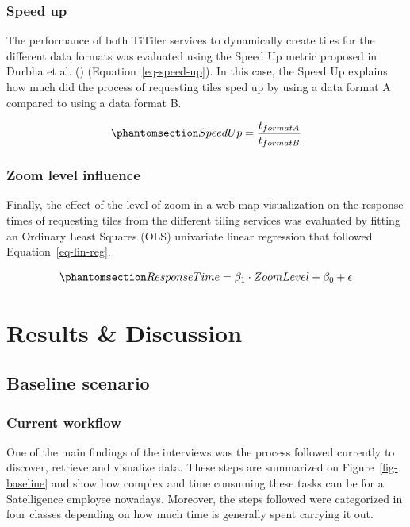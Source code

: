 \documentclass[
  oneside,
  open=any]{scrbook}
\begin{document}
\subsection{Speed up}\label{speed-up}

The performance of both TiTiler services to dynamically create tiles for
the different data formats was evaluated using the Speed Up metric
proposed in Durbha et al. ()
(Equation~\ref{eq-speed-up}). In this case, the Speed Up explains how
much did the process of requesting tiles sped up by using a data format
A compared to using a data format B.

\begin{equation}\phantomsection\label{eq-speed-up}{ SpeedUp = \frac{t_{format A}}{t_{format B}} }\end{equation}

\subsection{Zoom level influence}\label{zoom-level-influence}

Finally, the effect of the level of zoom in a web map visualization on
the response times of requesting tiles from the different tiling
services was evaluated by fitting an Ordinary Least Squares (OLS)
univariate linear regression that followed Equation~\ref{eq-lin-reg}.

\begin{equation}\phantomsection\label{eq-lin-reg}{ ResponseTime = \beta_1 \cdot ZoomLevel + \beta_0 + \epsilon }\end{equation}

\chapter{Results \& Discussion}\label{results-discussion}

\section{Baseline scenario}\label{baseline-scenario}

\subsection{Current workflow}\label{current-workflow}

One of the main findings of the interviews was the process followed
currently to discover, retrieve and visualize data. These steps are
summarized on Figure~\ref{fig-baseline} and show how complex and time
consuming these tasks can be for a Satelligence employee nowadays.
Moreover, the steps followed were categorized in four classes depending
on how much time is generally spent carrying it out.
\end{document}
